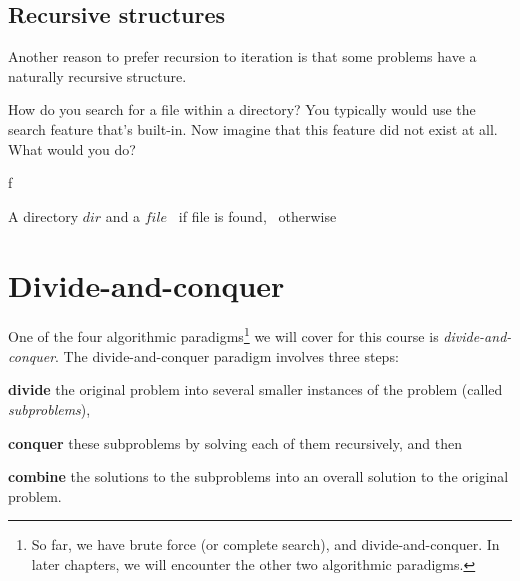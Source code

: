 \subsection{Recursive structures}
Another reason to prefer recursion to iteration is that some problems have a naturally recursive structure.

\begin{example}
How do you search for a file within a directory? You typically would use the search feature that's built-in. Now imagine that this feature did not exist at all. What would you do?



\begin{algorithm}[H]
    \caption{f}
    \begin{algorithmic}[1]
    \Require A directory $\textit{dir}$ and a $\textit{file}$
    \Ensure \algtrue\ if file is found, \algfalse\ otherwise
            \Return \algtrue
            \EndIf
        \EndFor
            \Return {}
        \EndFor
        \Return \algfalse
    \EndFunction
\end{algorithmic}
\end{algorithm}
\end{example}

\section{Divide-and-conquer}
One of the four algorithmic paradigms\footnote{So far, we have brute force (or complete search), and divide-and-conquer. In later chapters, we will encounter the other two algorithmic paradigms.} we will cover for this course is \textit{divide-and-conquer}. The divide-and-conquer paradigm involves three steps:
\begin{enumerate*}
    \item \textbf{divide} the original problem into several smaller instances of the problem (called \textit{subproblems}),
    \item \textbf{conquer} these subproblems by solving each of them recursively, and then
    \item \textbf{combine} the solutions to the subproblems into an overall solution to the original problem.
\end{enumerate*}

